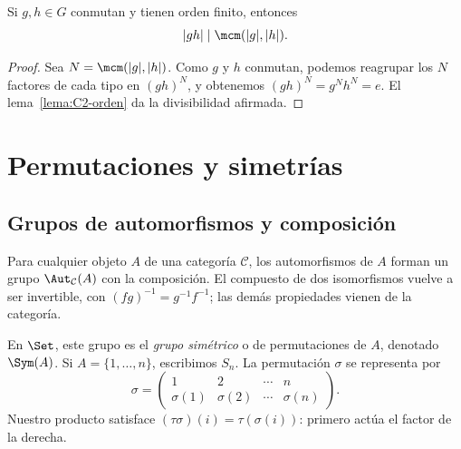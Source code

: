 \begin{prop}\label{prop:C2-producto-orden}
Si $g,h\in G$ conmutan y tienen orden finito, entonces
\[
|gh|\mid\mcm(|g|,|h|).
\]
\end{prop}
\begin{proof}
Sea $N=\mcm(|g|,|h|)$. Como $g$ y $h$ conmutan, podemos reagrupar los $N$ factores de cada tipo en $(gh)^N$, y obtenemos $(gh)^N=g^Nh^N=e$. El lema~\ref{lema:C2-orden} da la divisibilidad afirmada.
\end{proof}

\section{Permutaciones y simetrías}
\subsection{Grupos de automorfismos y composición}
Para cualquier objeto $A$ de una categoría $\mathcal C$, los automorfismos de $A$ forman un grupo $\Aut_{\mathcal C}(A)$ con la composición. El compuesto de dos isomorfismos vuelve a ser invertible, con $(fg)^{-1}=g^{-1}f^{-1}$; las demás propiedades vienen de la categoría.

En $\Set$, este grupo es el \emph{grupo simétrico} o de permutaciones de $A$, denotado $\Sym(A)$. Si $A=\{1,\ldots,n\}$, escribimos $S_n$. La permutación $\sigma$ se representa por
\[
\sigma=\begin{pmatrix}1&2&\cdots&n\\\sigma(1)&\sigma(2)&\cdots&\sigma(n)\end{pmatrix}.
\]
Nuestro producto satisface $(\tau\sigma)(i)=\tau(\sigma(i))$: primero actúa el factor de la derecha.


